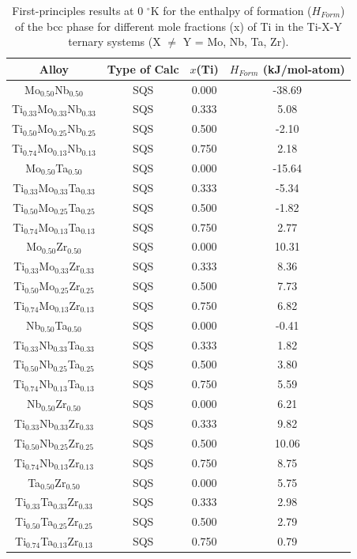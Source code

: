 \newpage
\begin{table}[H]
	\caption{First-principles results at 0 $^{\circ}$K for the enthalpy of formation ($H_{Form}$) of the bcc phase for different mole fractions (x) of Ti in the Ti-X-Y ternary systems (X $\neq$ Y = Mo, Nb, Ta, Zr).}
	\centering
	\begin{tabular}{ c c c c }
		\hline
		Alloy & Type of Calc & $x$(Ti) & $H_{Form}$ (kJ/mol-atom)\\
		\hline
		Mo$_{0.50}$Nb$_{0.50}$ & SQS & 0.000 & -38.69\\
		Ti$_{0.33}$Mo$_{0.33}$Nb$_{0.33}$ & SQS & 0.333 & 5.08\\
		Ti$_{0.50}$Mo$_{0.25}$Nb$_{0.25}$ & SQS & 0.500 & -2.10\\
		Ti$_{0.74}$Mo$_{0.13}$Nb$_{0.13}$ & SQS & 0.750 & 2.18\\
		Mo$_{0.50}$Ta$_{0.50}$ & SQS & 0.000 & -15.64\\
		Ti$_{0.33}$Mo$_{0.33}$Ta$_{0.33}$ & SQS & 0.333 & -5.34\\
		Ti$_{0.50}$Mo$_{0.25}$Ta$_{0.25}$ & SQS & 0.500 & -1.82\\
		Ti$_{0.74}$Mo$_{0.13}$Ta$_{0.13}$ & SQS & 0.750 & 2.77\\
		Mo$_{0.50}$Zr$_{0.50}$ & SQS & 0.000 & 10.31\\
		Ti$_{0.33}$Mo$_{0.33}$Zr$_{0.33}$ & SQS & 0.333 & 8.36\\
		Ti$_{0.50}$Mo$_{0.25}$Zr$_{0.25}$ & SQS & 0.500 & 7.73\\
		Ti$_{0.74}$Mo$_{0.13}$Zr$_{0.13}$ & SQS & 0.750 & 6.82\\
		Nb$_{0.50}$Ta$_{0.50}$ & SQS & 0.000 & -0.41\\
		Ti$_{0.33}$Nb$_{0.33}$Ta$_{0.33}$ & SQS & 0.333 & 1.82\\
		Ti$_{0.50}$Nb$_{0.25}$Ta$_{0.25}$ & SQS & 0.500 & 3.80\\
		Ti$_{0.74}$Nb$_{0.13}$Ta$_{0.13}$ & SQS & 0.750 & 5.59\\
		Nb$_{0.50}$Zr$_{0.50}$ & SQS & 0.000 & 6.21\\
		Ti$_{0.33}$Nb$_{0.33}$Zr$_{0.33}$ & SQS & 0.333 & 9.82\\
		Ti$_{0.50}$Nb$_{0.25}$Zr$_{0.25}$ & SQS & 0.500 & 10.06\\
		Ti$_{0.74}$Nb$_{0.13}$Zr$_{0.13}$ & SQS & 0.750 & 8.75\\
		Ta$_{0.50}$Zr$_{0.50}$ & SQS & 0.000 & 5.75\\
		Ti$_{0.33}$Ta$_{0.33}$Zr$_{0.33}$ & SQS & 0.333 & 2.98\\
		Ti$_{0.50}$Ta$_{0.25}$Zr$_{0.25}$ & SQS & 0.500 & 2.79\\
		Ti$_{0.74}$Ta$_{0.13}$Zr$_{0.13}$ & SQS & 0.750 & 0.79\\
		\hline
	\end{tabular}
	\label{Ch3-table:ternhform}
\end{table}
\clearpage

